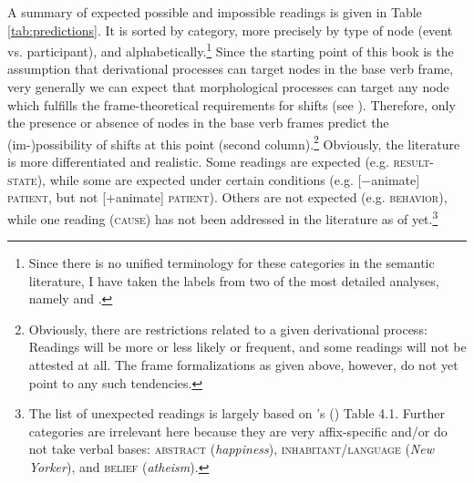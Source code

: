 A summary of expected possible and impossible readings is given in Table \ref{tab:predictions}. It is sorted by category, more precisely by type of node (event vs. participant), and alphabetically.\footnote{Since there is no unified terminology for these categories in the semantic literature, I have taken the labels from two of the most detailed analyses, namely \citet{Bauer.2013} and \citet{Lieber.2016}.}
Since the starting point of this book is the assumption that derivational processes can target nodes in the base verb frame, very generally we can expect that morphological processes can target any node which fulfills the frame-theoretical requirements for shifts (see ). Therefore, only the presence or absence of nodes in the base verb frames predict the (im-)possibility of shifts at this point (second column).\footnote{Obviously, there are restrictions related to a given derivational process: Readings will be more or less likely or frequent, and some readings will not be attested at all. The frame formalizations as given above, however, do not yet point to any such tendencies.}
Obviously, the literature is more differentiated and realistic. Some readings are expected (e.g. \textsc{result-state}), while some are expected under certain conditions (e.g. [−animate] \textsc{patient}, but not [+animate] \textsc{patient}). Others are not expected (e.g. \textsc{behavior}), while one reading (\textsc{cause}) has not been addressed in the literature as of yet.\footnote{The list of unexpected readings is largely based on \citeauthor{Lieber.2016}'s (\citeyear{Lieber.2016}) Table 4.1. Further categories are irrelevant here because they are very affix-specific and/or do not take verbal bases: \textsc{abstract} (\textit{happiness}), \textsc{inhabitant/language} (\textit{New Yorker}), and \textsc{belief} (\textit{atheism}).}  


